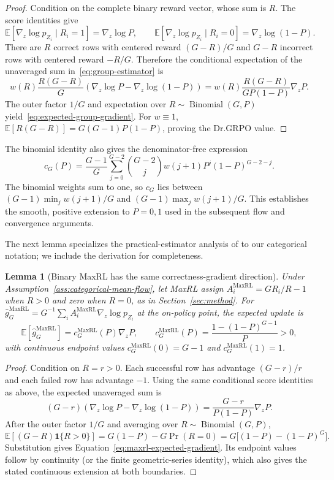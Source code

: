 \documentclass{article}
\newcommand{\1}{\mathbf 1}
\newcommand{\E}{\mathbb E}
\newtheorem{lemma}{Lemma}[section]
\theoremstyle{remark}
\theoremstyle{definition}
\theoremstyle{plain}
\begin{document}
\begin{proof}
Condition on the complete binary reward vector, whose sum is $R$. The score
identities give
\[
  \E[\nabla_z\log p_{Z_i}\mid R_i=1]=\nabla_z\log P,
  \qquad
  \E[\nabla_z\log p_{Z_i}\mid R_i=0]
  =\nabla_z\log(1-P).
\]
There are $R$ correct rows with centered reward $(G-R)/G$ and $G-R$
incorrect rows with centered reward $-R/G$. Therefore the conditional
expectation of the unaveraged sum in~\eqref{eq:group-estimator} is
\[
  w(R)\frac{R(G-R)}{G}
  \left(\nabla_z\log P-\nabla_z\log(1-P)\right)
  =w(R)\frac{R(G-R)}{GP(1-P)}\nabla_zP.
\]
The outer factor $1/G$ and expectation over
$R\sim\operatorname{Binomial}(G,P)$ yield~\eqref{eq:expected-group-gradient}.
For $w\equiv1$,
$\E[R(G-R)]=G(G-1)P(1-P)$, proving the Dr.GRPO value.
\end{proof}

The binomial identity also gives the denominator-free expression
\[
 c_G(P)=\frac{G-1}{G}\sum_{j=0}^{G-2}\binom{G-2}{j}
 w(j+1)P^j(1-P)^{G-2-j}.
\]
The binomial weights sum to one, so $c_G$ lies between
$(G-1)\min_j w(j+1)/G$ and $(G-1)\max_j w(j+1)/G$.
This establishes the smooth, positive extension to $P=0,1$ used in the
subsequent flow and convergence arguments.

The next lemma specializes the practical-estimator analysis of
\citet[Section~4.3 and App.~D, Theorem~5]{tajwar2026maxrl}
to our categorical notation; we include the derivation for completeness.

\begin{lemma}[Binary MaxRL has the same correctness-gradient direction]
\label{lem:maxrl-mean}
Under Assumption~\ref{ass:categorical-mean-flow}, let MaxRL assign
$A_i^{\mathrm{MaxRL}}=GR_i/R-1$ when $R>0$ and zero when $R=0$, as in
Section~\ref{sec:method}. For
$\widehat g_G^{\mathrm{MaxRL}}=G^{-1}\sum_i
 A_i^{\mathrm{MaxRL}}\nabla_z\log p_{Z_i}$ at the on-policy point, the
expected update is
\begin{equation}
  \E[\widehat g_G^{\mathrm{MaxRL}}]
  =c_G^{\mathrm{MaxRL}}(P)\nabla_zP,
  \qquad
  c_G^{\mathrm{MaxRL}}(P)
  =\frac{1-(1-P)^{G-1}}{P}>0,
  \label{eq:maxrl-expected-gradient}
\end{equation}
with continuous endpoint values
$c_G^{\mathrm{MaxRL}}(0)=G-1$ and
$c_G^{\mathrm{MaxRL}}(1)=1$.
\end{lemma}

\begin{proof}
Condition on $R=r>0$. Each successful row has advantage $(G-r)/r$ and each
failed row has advantage $-1$. Using the same conditional score identities as
above, the expected unaveraged sum is
\[
  (G-r)\!\left(\nabla_z\log P-\nabla_z\log(1-P)\right)
  =\frac{G-r}{P(1-P)}\nabla_zP.
\]
After the outer factor $1/G$ and averaging over
$R\sim\operatorname{Binomial}(G,P)$,
\[
 \E[(G-R)\1\{R>0\}]
 =G(1-P)-G\Pr(R=0)
 =G\big[(1-P)-(1-P)^G\big].
\]
Substitution gives Equation~\eqref{eq:maxrl-expected-gradient}. Its endpoint
values follow by continuity (or the finite geometric-series identity), which
also gives the stated continuous extension at both boundaries.
\end{proof}
\end{document}
